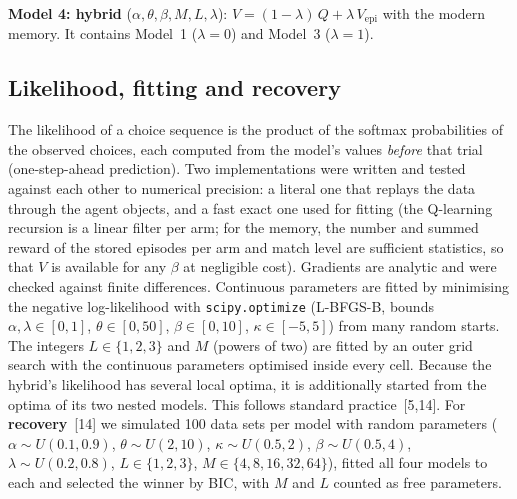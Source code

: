 \documentclass[10pt,a4paper]{article}
\newcommand{\Vepi}{V_{\mathrm{epi}}}
\begin{document}
\textbf{Model 4: hybrid} ($\alpha,\theta,\beta,M,L,\lambda$): $V=(1-\lambda)\,Q+\lambda\,\Vepi$ with the modern
memory. It contains Model~1 ($\lambda=0$) and Model~3 ($\lambda=1$).

\subsection{Likelihood, fitting and recovery}
The likelihood of a choice sequence is the product of the softmax probabilities of the observed choices, each
computed from the model's values \emph{before} that trial (one-step-ahead prediction). Two implementations were
written and tested against each other to numerical precision: a literal one that replays the data through the
agent objects, and a fast exact one used for fitting (the Q-learning recursion is a linear filter per arm; for the
memory, the number and summed reward of the stored episodes per arm and match level are sufficient statistics,
so that $V$ is available for any $\beta$ at negligible cost). Gradients are analytic and were checked against
finite differences. Continuous parameters are fitted by minimising the negative log-likelihood with
\texttt{scipy.optimize} (L-BFGS-B, bounds $\alpha,\lambda\in[0,1]$, $\theta\in[0,50]$, $\beta\in[0,10]$,
$\kappa\in[-5,5]$) from many random starts. The integers $L\in\{1,2,3\}$ and $M$ (powers of two) are fitted by
an outer grid search with the continuous parameters optimised inside every cell. Because the hybrid's likelihood
has several local optima, it is additionally started from the optima of its two nested models.
This follows standard practice~[5,14]. For \textbf{recovery}~[14] we simulated 100 data sets per model with random parameters
($\alpha\sim U(0.1,0.9)$, $\theta\sim U(2,10)$, $\kappa\sim U(0.5,2)$, $\beta\sim U(0.5,4)$,
$\lambda\sim U(0.2,0.8)$, $L\in\{1,2,3\}$, $M\in\{4,8,16,32,64\}$), fitted all four models to each and selected
the winner by BIC, with $M$ and $L$ counted as free parameters.
\end{document}

